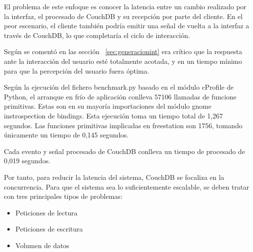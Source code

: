 El problema de este enfoque es conocer la latencia
entre un cambio realizado por la interfaz, el procesado de CouchDB y su 
recepción por parte del cliente. En el peor escenario, el cliente también 
podría emitir una señal de vuelta a la interfaz a través de CouchDB, lo que
completaría el ciclo de interacción.

Según se comentó en las sección ~\ref{sec:generacionint} era
crítico que la respuesta ante la interacción del usuario esté totalmente 
acotada, y en un tiempo mínimo para que la percepción del usuario fuera óptima.

Según la ejecución del fichero benchmark.py basado en el módulo cProfile de
Python, el arranque en frío de aplicación conlleva 57106 llamadas de
funcione primitivas. Estas son en su mayoría importaciones del módulo gnome
instrospection de bindings. Esta ejecución toma un tiempo total de 1,267 segundos.
Las funciones primitivas implicadas en freestation son 1756, tomando únicamente
un tiempo de 0,145 segundos.

Cada evento y señal procesado de CouchDB conlleva un tiempo de procesado de
0,019 segundos. 

Por tanto, para reducir la latencia del sistema, CouchDB se focaliza en la 
concurrencia. Para que el sistema sea lo suficientemente escalable, se
deben tratar con tres principales tipos de problemas:

\begin{itemize}
    \item Peticiones de lectura
    \item Peticiones de escritura
    \item Volumen de datos
\end{itemize}


